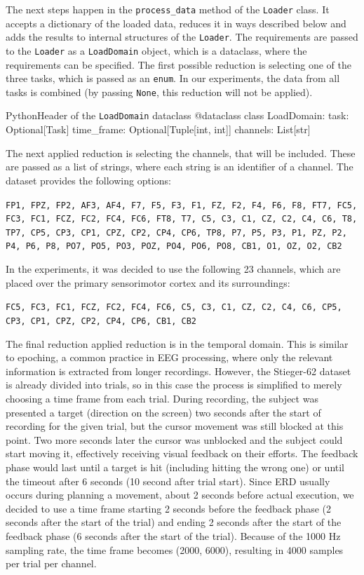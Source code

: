 \documentclass[english, he, bc, kiv, iso690alph]{fasthesis}
\begin{document}
The next steps happen in the \texttt{process\_data} method of the \texttt{Loader} class. It accepts a dictionary of the loaded data, reduces it in ways described below and adds the results to internal structures of the \texttt{Loader}. The requirements are passed to the \texttt{Loader} as a \texttt{LoadDomain} object, which is a dataclass, where the requirements can be specified. The first possible reduction is selecting one of the three tasks, which is passed as an \texttt{enum}. In our experiments, the data from all tasks is combined (by passing \texttt{None}, this reduction will not be applied).

\begin{code}{Python}{Header of the \texttt{LoadDomain} dataclass}
	@dataclass
	class LoadDomain:
	task: Optional[Task]
	time_frame: Optional[Tuple[int, int]]
	channels: List[str]
\end{code}

The next applied reduction is selecting the channels, that will be included. These are passed as a list of strings, where each string is an identifier of a channel. The dataset provides the following options:

\texttt{FP1, FPZ, FP2, AF3, AF4, F7, F5, F3, F1, FZ, F2, F4, F6, F8, FT7, FC5, FC3, FC1, FCZ, FC2, FC4, FC6, FT8, T7, C5, C3, C1, CZ, C2, C4, C6, T8, TP7, CP5, CP3, CP1, CPZ, CP2, CP4, CP6, TP8, P7, P5, P3, P1, PZ, P2, P4, P6, P8, PO7, PO5, PO3, POZ, PO4, PO6, PO8, CB1, O1, OZ, O2, CB2}

In the experiments, it was decided to use the following 23 channels, which are placed over the primary sensorimotor cortex and its surroundings:

\texttt{FC5, FC3, FC1, FCZ, FC2, FC4, FC6, C5, C3, C1, CZ, C2, C4, C6, CP5, CP3, CP1, CPZ, CP2, CP4, CP6, CB1, CB2}

The final reduction applied reduction is in the temporal domain. This is similar to epoching, a common practice in EEG processing, where only the relevant information is extracted from longer recordings. However, the Stieger-62 dataset is already divided into trials, so in this case the process is simplified to merely choosing a time frame from each trial. During recording, the subject was presented a target (direction on the screen) two seconds after the start of recording for the given trial, but the cursor movement was still blocked at this point. Two more seconds later the cursor was unblocked and the subject could start moving it, effectively receiving visual feedback on their efforts. The feedback phase would last until a target is hit (including hitting the wrong one) or until the timeout after 6 seconds (10 second after trial start). Since ERD usually occurs during planning a movement, about 2 seconds before actual execution, we decided to use a time frame starting 2 seconds before the feedback phase (2 seconds after the start of the trial) and ending 2 seconds after the start of the feedback phase (6 seconds after the start of the trial). Because of the 1000 Hz sampling rate, the time frame becomes (2000, 6000), resulting in 4000 samples per trial per channel.
\end{document}
